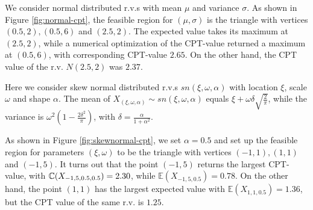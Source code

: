 \begin{example}
We consider normal distributed r.v.s with mean $\mu$ and variance $\sigma$. As shown in Figure \ref{fig:normal-cpt}, the feasible region for $(\mu, \sigma)$ is the triangle with vertices $(0.5,2), (0.5,6)$ and $(2.5,2)$. The expected value takes its maximum at $(2.5, 2)$, while a numerical optimization of the CPT-value returned a maximum at $(0.5, 6)$, with corresponding CPT-value $2.65$. On the other hand, the CPT value of the r.v. $N(2.5, 2)$ was $2.37$.
\end{example}

\begin{example}
Here we consider skew normal distributed r.v.s $sn(\xi, \omega, \alpha)$ with location $\xi$, scale $\omega$ and shape $\alpha$.  
The mean of $X_{(\xi, \omega, \alpha)} \sim sn(\xi, \omega, \alpha)$ equals 
$\xi + \omega \delta \sqrt{\frac{2}{\pi}}$, while the  variance is
$\omega^2(1 - \frac{2\delta^2}{\pi})$, with $\delta = \frac{\alpha}{1 + \alpha^2}$.

As shown in Figure \ref{fig:skewnormal-cpt}, we set $\alpha=0.5$ and set up the feasible region for parameters $(\xi, \omega)$ to be the triangle with vertices $(-1,1), (1,1)$ and $(-1,5)$.  
It turns out that the point $(-1,5)$ returns the largest CPT-value, with $\mathbb{C}(X_{-1,5,0.5,0.5}) = 2.30$, while
$\mathbb{E}(X_{-1,5,0.5}) = 0.78$.
On the other hand, the point $(1,1)$ has the largest expected value with $\mathbb{E}(X_{1,1,0.5}) = 1.36$, but the CPT value of the same r.v. is $1.25$.
\end{example}


